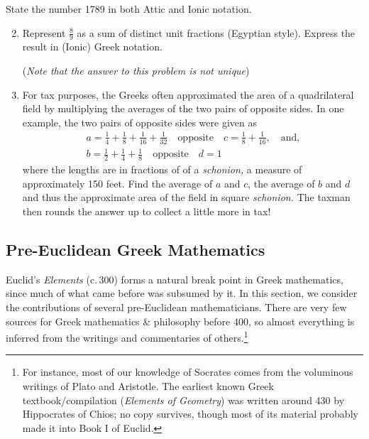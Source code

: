 \begin{exercises}{}{}
\exstart State the number 1789 in both Attic and Ionic notation.
\begin{enumerate}\setcounter{enumi}{1}
  \item%
  Represent $\frac 89$ as a sum of distinct unit fractions (Egyptian style). Express the result in (Ionic) Greek notation.\par
  (\emph{Note that the answer to this problem is not unique})
  
  \item%
  For tax purposes, the Greeks often approximated the area of a quadrilateral field by multiplying the averages of the two pairs of opposite sides. In one example, the two pairs of opposite sides were given as
  \begin{gather*}
  a=\frac 14+\frac 18+\frac 1{16}+\frac 1{32}\quad\text{opposite}\quad c=\frac 18+\frac 1{16},\quad\text{and,}\\
  b=\frac 12+\frac 14+\frac 18\quad\text{opposite}\quad d=1
  \end{gather*}
  where the lengths are in fractions of of a \emph{schonion,} a measure of approximately 150 feet. Find the average of $a$ and $c$, the average of $b$ and $d$ and thus the approximate area of the field in square \emph{schonion.} The taxman then rounds the answer up to collect a little more in tax!
\end{enumerate}
\end{exercises}

\clearpage

\subsection{Pre-Euclidean Greek Mathematics}

Euclid's \emph{Elements} (c.\,300\BC) forms a natural break point in Greek mathematics, since much of what came before was subsumed by it. In this section, we consider the contributions of several pre-Euclidean mathematicians. There are very few sources for Greek mathematics \& philosophy before 400\BC{}, so almost everything is inferred from the writings and commentaries of others.\footnote{For instance, most of our knowledge of Socrates comes from the voluminous writings of Plato and Aristotle. The earliest known Greek textbook/compilation (\emph{Elements of Geometry}) was written around 430\BC{} by Hippocrates of Chios; no copy survives, though most of its material probably made it into Book I of Euclid.}\vspace{-5pt}

